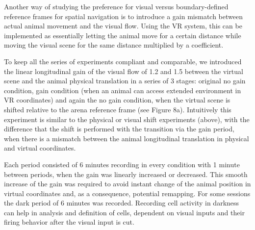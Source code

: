 Another way of studying the preference for visual versus boundary-defined reference frames for spatial navigation is to introduce a gain mismatch between actual animal movement and the visual flow. Using the VR system, this can be implemented as essentially letting the animal move for a certain distance while moving the visual scene for the same distance multiplied by a coefficient.

To keep all the series of experiments compliant and comparable, we introduced the linear longitudinal gain of the visual flow of 1.2 and 1.5 between the virtual scene and the animal physical translation in a series of 3 stages: original no gain condition, gain condition (when an animal can access extended environment in VR coordinates) and again the no gain condition, when the virtual scene is shifted relative to the arena reference frame (see Figure 8a). Intuitively this experiment is similar to the physical or visual shift experiments (above), with the difference that the shift is performed with the transition via the gain period, when there is a mismatch between the animal longitudinal translation in physical and virtual coordinates.

Each period consisted of 6 minutes recording in every condition with 1 minute between periods, when the gain was linearly increased or decreased. This smooth increase of the gain was required to avoid instant change of the animal position in virtual coordinates and, as a consequence, potential remapping. For some sessions the dark period of 6 minutes was recorded. Recording cell activity in darkness can help in analysis and definition of cells, dependent on visual inputs and their firing behavior after the visual input is cut.

